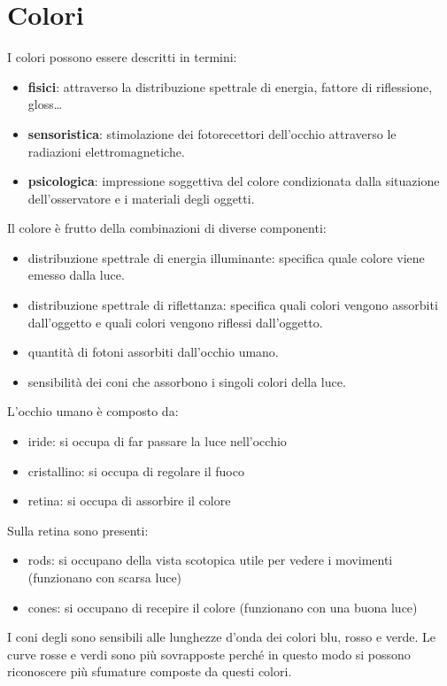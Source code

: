 \chapter{Colori}
I colori possono essere descritti in termini:
\begin{itemize}
    \item \textbf{fisici}: attraverso la distribuzione spettrale di energia,
          fattore di riflessione, gloss\dots
    \item \textbf{sensoristica}: stimolazione dei fotorecettori dell'occhio attraverso
          le radiazioni elettromagnetiche.
    \item \textbf{psicologica}: impressione soggettiva del colore condizionata
          dalla situazione dell'osservatore e i materiali degli oggetti.
\end{itemize}

Il colore è frutto della combinazioni di diverse componenti:
\begin{itemize}
    \item distribuzione spettrale di energia illuminante: specifica quale colore
          viene emesso dalla luce.
    \item distribuzione spettrale di riflettanza: specifica quali colori vengono
          assorbiti dall'oggetto e quali colori vengono riflessi dall'oggetto.
    \item quantità di fotoni assorbiti dall'occhio umano.
    \item sensibilità dei coni che assorbono i singoli colori della luce.
\end{itemize}

L'occhio umano è composto da:
\begin{itemize}
    \item iride: si occupa di far passare la luce nell'occhio
    \item cristallino: si occupa di regolare il fuoco
    \item retina: si occupa di assorbire il colore
\end{itemize}

Sulla retina sono presenti:
\begin{itemize}
    \item rods: si occupano della vista scotopica utile per vedere i movimenti (funzionano con scarsa luce)
    \item cones: si occupano di recepire il colore (funzionano con una buona luce)
\end{itemize}

I coni degli sono sensibili alle lunghezze d'onda dei colori blu, rosso e verde.
Le curve rosse e verdi sono più sovrapposte perché in questo modo si possono
riconoscere più sfumature composte da questi colori.

